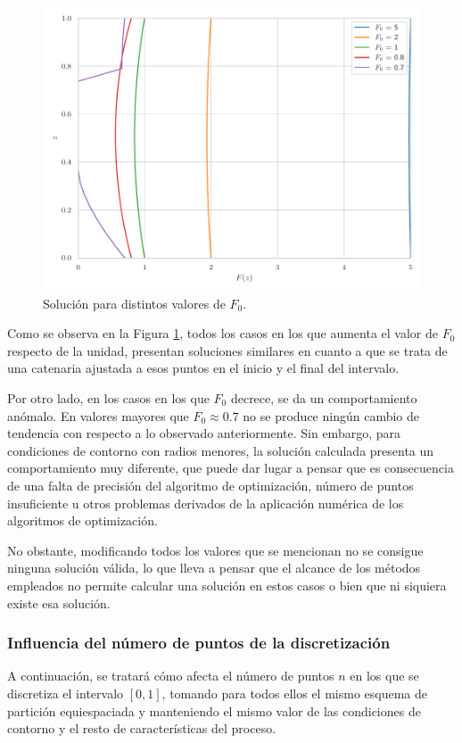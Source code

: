 \begin{figure}[h]
    \centering
    \includegraphics[width = 0.6 \linewidth]{Figures/01/sol_radios.pdf}
    \caption{Solución para distintos valores de $F_0$.}
    \label{fig:sol_radios}
\end{figure}

Como se observa en la Figura \ref{fig:sol_radios}, todos los casos en los que aumenta el valor de $F_0$ respecto de la unidad, presentan soluciones similares en cuanto a que se trata de una catenaria ajustada a esos puntos en el inicio y el final del intervalo.

Por otro lado, en los casos en los que $F_0$ decrece, se da un comportamiento anómalo. En valores mayores que $F_0 \approx 0.7$ no se produce ningún cambio de tendencia con respecto a lo observado anteriormente. Sin embargo, para condiciones de contorno con radios menores, la solución calculada presenta un comportamiento muy diferente, que puede dar lugar a pensar que es consecuencia de una falta de precisión del algoritmo de optimización, número de puntos insuficiente u otros problemas derivados de la aplicación numérica de los algoritmos de optimización. 

No obstante, modificando todos los valores que se mencionan no se consigue ninguna solución válida, lo que lleva a pensar que el alcance de los métodos empleados no permite calcular una solución en estos casos o bien que ni siquiera existe esa solución.


\subsubsection{Influencia del número de puntos de la discretización}\label{ap:infl_n}

A continuación, se tratará cómo afecta el número de puntos $n$ en los que se discretiza el intervalo $[0, 1]$, tomando para todos ellos el mismo esquema de partición equiespaciada y manteniendo el mismo valor de las condiciones de contorno y el resto de características del proceso.

